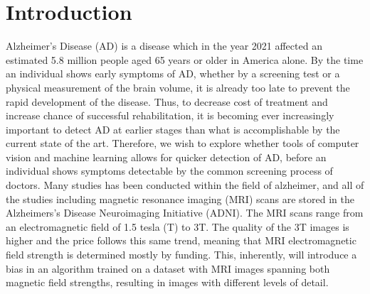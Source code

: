 \documentclass[12pt, fleqn, titlepage]{article}
\begin{document}
\begin{abstract}
	
\end{abstract}

{
\hypersetup{linkcolor=black}
\tableofcontents 
\newpage
}

\section{Introduction} \label{indledning}
Alzheimer’s Disease (AD) is a disease which in the year 2021 affected an
estimated 5.8 million people aged 65 years or older in America alone. By the
time an individual shows early symptoms of AD, whether by a screening test
or a physical measurement of the brain volume, it is already too late to prevent the rapid development of the disease. Thus, to decrease cost of treatment
and increase chance of successful rehabilitation, it is becoming ever increasingly
important to detect AD at earlier stages than what is accomplishable by the
current state of the art. Therefore, we wish to explore whether tools of computer vision and machine learning allows for quicker detection of AD, before
an individual shows symptoms detectable by the common screening process of
doctors. Many studies has been conducted within the field of alzheimer, and
all of the studies including magnetic resonance imaging (MRI) scans are stored
in the Alzheimers’s Disease Neuroimaging Initiative (ADNI). The MRI scans
range from an electromagnetic field of 1.5 tesla (T) to 3T. The quality of the 3T
images is higher and the price follows this same trend, meaning that MRI electromagnetic field strength is determined mostly by funding. This, inherently,
will introduce a bias in an algorithm trained on a dataset with MRI images
spanning both magnetic field strengths, resulting in images with different levels
of detail.
\end{document}

